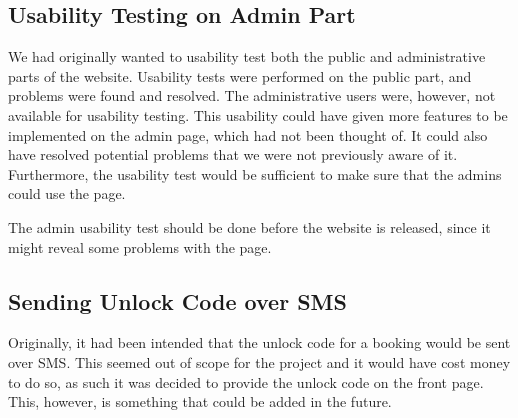 \subsection{Usability Testing on Admin Part}
We had originally wanted to usability test both the public and administrative parts of the website.
Usability tests were performed on the public part, and problems were found and resolved. 
The administrative users were, however, not available for usability testing.
This usability could have given more features to be implemented on the admin page, which had not been thought of.
It could also have resolved potential problems that we were not previously aware of it.
Furthermore, the usability test would be sufficient to make sure that the admins could use the page.

The admin usability test should be done before the website is released, since it might reveal some problems with the page.

\subsection{Sending Unlock Code over SMS}
Originally, it had been intended that the unlock code for a booking would be sent over SMS. 
This seemed out of scope for the project and it would have cost money to do so, as such it was decided to provide the unlock code on the front page. 
This, however, is something that could be added in the future.